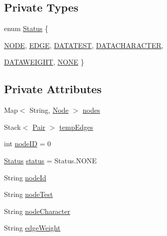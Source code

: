 \subsection*{Private Types}
\begin{DoxyCompactItemize}
\item 
enum \hyperlink{classch_1_1zhaw_1_1ba10__bsha__1_1_1graph_1_1GraphMLParser_aaf3d4942a1edfa4a19addb2f2c0cdb9c}{Status} \{ \par
\hyperlink{classch_1_1zhaw_1_1ba10__bsha__1_1_1graph_1_1GraphMLParser_aaf3d4942a1edfa4a19addb2f2c0cdb9c}{NODE}, 
\hyperlink{classch_1_1zhaw_1_1ba10__bsha__1_1_1graph_1_1GraphMLParser_aaf3d4942a1edfa4a19addb2f2c0cdb9c}{EDGE}, 
\hyperlink{classch_1_1zhaw_1_1ba10__bsha__1_1_1graph_1_1GraphMLParser_aaf3d4942a1edfa4a19addb2f2c0cdb9c}{DATATEST}, 
\hyperlink{classch_1_1zhaw_1_1ba10__bsha__1_1_1graph_1_1GraphMLParser_aaf3d4942a1edfa4a19addb2f2c0cdb9c}{DATACHARACTER}, 
\par
\hyperlink{classch_1_1zhaw_1_1ba10__bsha__1_1_1graph_1_1GraphMLParser_aaf3d4942a1edfa4a19addb2f2c0cdb9c}{DATAWEIGHT}, 
\hyperlink{classch_1_1zhaw_1_1ba10__bsha__1_1_1graph_1_1GraphMLParser_aaf3d4942a1edfa4a19addb2f2c0cdb9c}{NONE}
 \}
\end{DoxyCompactItemize}
\subsection*{Private Attributes}
\begin{DoxyCompactItemize}
\item 
Map$<$ String, \hyperlink{classch_1_1zhaw_1_1ba10__bsha__1_1_1graph_1_1Node}{Node} $>$ \hyperlink{classch_1_1zhaw_1_1ba10__bsha__1_1_1graph_1_1GraphMLParser_ac367709d47f36449600550ee700271c5}{nodes}
\item 
Stack$<$ \hyperlink{classch_1_1zhaw_1_1ba10__bsha__1_1_1graph_1_1GraphMLParser_1_1Pair}{Pair} $>$ \hyperlink{classch_1_1zhaw_1_1ba10__bsha__1_1_1graph_1_1GraphMLParser_ac4f86507ba5f92c81a9d1736e50866a4}{tempEdges}
\item 
int \hyperlink{classch_1_1zhaw_1_1ba10__bsha__1_1_1graph_1_1GraphMLParser_a5761f7b6b239f00aba8a3d2d93cc093c}{nodeID} = 0
\item 
\hyperlink{classch_1_1zhaw_1_1ba10__bsha__1_1_1graph_1_1GraphMLParser_aaf3d4942a1edfa4a19addb2f2c0cdb9c}{Status} \hyperlink{classch_1_1zhaw_1_1ba10__bsha__1_1_1graph_1_1GraphMLParser_aad96857e9c5dd4c59f408b26937a0c72}{status} = Status.NONE
\item 
String \hyperlink{classch_1_1zhaw_1_1ba10__bsha__1_1_1graph_1_1GraphMLParser_a08f6eb33a630ada96db0b4359f034e85}{nodeId}
\item 
String \hyperlink{classch_1_1zhaw_1_1ba10__bsha__1_1_1graph_1_1GraphMLParser_a80dbdb8f56f9fdee9a0471acdc0078eb}{nodeTest}
\item 
String \hyperlink{classch_1_1zhaw_1_1ba10__bsha__1_1_1graph_1_1GraphMLParser_a93c139de1399a5b2741e5554f7138ee5}{nodeCharacter}
\item 
String \hyperlink{classch_1_1zhaw_1_1ba10__bsha__1_1_1graph_1_1GraphMLParser_abd140ea7e8e8b6f312f1823e309eacf4}{edgeWeight}
\end{DoxyCompactItemize}
